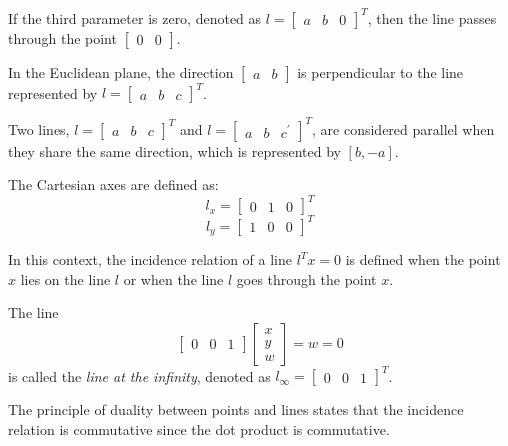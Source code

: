 \begin{property}
    If the third parameter is zero, denoted as ${l=\begin{bmatrix} a & b & 0 \end{bmatrix}}^T$, then the line passes through the point $\begin{bmatrix} 0 & 0 \end{bmatrix}$. 
\end{property}
\begin{property}
    In the Euclidean plane, the direction $\begin{bmatrix} a & b \end{bmatrix}$ is perpendicular to the line represented by ${l=\begin{bmatrix} a & b & c \end{bmatrix}}^T$.
\end{property}
\begin{property}
    Two lines, ${l=\begin{bmatrix} a & b & c \end{bmatrix}}^T$ and ${l=\begin{bmatrix} a & b & c^{'} \end{bmatrix}}^T$, are considered parallel when they share the same direction, which is represented by $[b,-a]$.
\end{property}
\begin{example}
    The Cartesian axes are defined as: 
    \[l_x={\begin{bmatrix} 0 & 1 & 0 \end{bmatrix}}^T\]
    \[l_y={\begin{bmatrix} 1 & 0 & 0 \end{bmatrix}}^T\]
\end{example}
In this context, the incidence relation of a line $l^Tx=0$ is defined when the point $x$ lies on the line $l$ or when the line $l$ goes through the point $x$. 
\begin{definition}
    The line 
    \[\begin{bmatrix} 0 & 0 & 1 \end{bmatrix} \begin{bmatrix} x \\ y \\ w \end{bmatrix}=w=0\] 
    is called the \emph{line at the infinity}, denoted as $l_{\infty}={\begin{bmatrix} 0 & 0 & 1 \end{bmatrix}}^T$. 
\end{definition}
The principle of duality between points and lines states that the incidence relation is commutative since the dot product is commutative.

